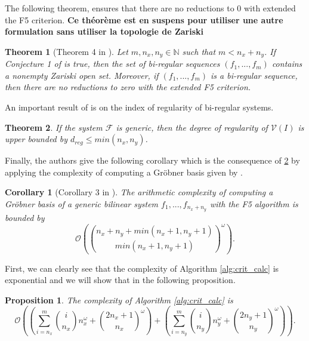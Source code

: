 \documentclass[english]{article}
\newtheorem{proposition}{Proposition}[section]
\newtheorem{theorem}{Theorem}[section]
\newtheorem{corollary}{Corollary}[section]
\begin{document}
		 The following theorem, ensures that there are no reductions to 0 with extended the F5 criterion. \textbf{Ce théorème est en suspens pour utiliser une autre formulation sans utiliser la topologie de Zariski}
		 
		 \begin{theorem}[Theorem 4 in \cite{FSS11}]
		 	Let $m, n_x, n_y \in \mathbb{N}$ such that $m < n_x + n_y$. If Conjecture 1 of \cite{FSS11} is true, then the set of bi-regular sequences $(f_1,...,f_m)$ contains a nonempty Zariski open set. Moreover, if $(f_1,...,f_m)$ is a bi-regular sequence, then there are no reductions to zero with the extended F5 criterion.
		 \end{theorem}
		 
		 An important result of \cite{FSS11} is on the index of regularity of bi-regular systems.
		 
		 \begin{theorem}\label{reg_bi}
		 	If the system $\mathcal{F}$ is generic, then the degree of regularity of $\mathcal{V}(I)$ is upper bounded by $d_{reg} \leq min(n_x, n_y)$.
		 \end{theorem}
		 
		 Finally, the authors give the following corollary which is the consequence of \ref{reg_bi} by applying the complexity of computing a Gröbner basis given by \cite{Bardet04}.
		 
		 \begin{corollary}[Corollary 3 in \cite{FSS11}]\label{complex_bi}
		 The arithmetic complexity of computing a Gröbner basis of a generic bilinear system $f_1,...,f_{n_x + n_y}$ with the F5 algorithm is bounded by
		 $$\mathcal{O}\left(\binom{n_x + n_y + min(n_x + 1, n_y + 1)}{min(n_x + 1, n_y + 1)}^\omega\right).$$
		 \end{corollary}
		 
		 First, we can clearly see that the complexity of Algorithm \ref{alg:crit_calc} is exponential and we will show that in the following proposition.
		 
		 \begin{proposition}\label{complexCrit}
		 	The complexity of Algorithm \ref{alg:crit_calc} is
		 	$$
		 	\mathcal{O}\left(\left(\sum_{i = n_x}^{m} \binom{i}{n_x}n_x^{\omega} + \binom{2n_x + 1}{n_x}^\omega\right) + \left(\sum_{i = n_y}^{m} \binom{i}{n_y}n_y^{\omega} + \binom{2n_y + 1}{n_y}^\omega\right)\right).
		 	$$
		 \end{proposition}
		 
\end{document}
